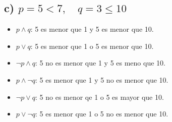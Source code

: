 \subsection*{c) $p = 5 < 7, \quad q = 3 \leq 10$}

\begin{itemize}
    \item $p \land q$: 5 es menor que 1 y 5 es menor que 10.
    \item $p \lor q$: 5 es menor que 1 o 5 es menor que 10.
    \item $\neg p \land q$: 5 no es menor que 1 y 5 es meno que 10.
    \item $p \land \neg q$: 5 es menor que 1 y 5 no es menor que 10.
    \item $\neg p \lor q$:  5 no es menor qe 1 o 5 es mayor que 10.
    \item $p \lor \neg q$: 5 es menor que 1 o 5 no es menor que 10.
\end{itemize}

 